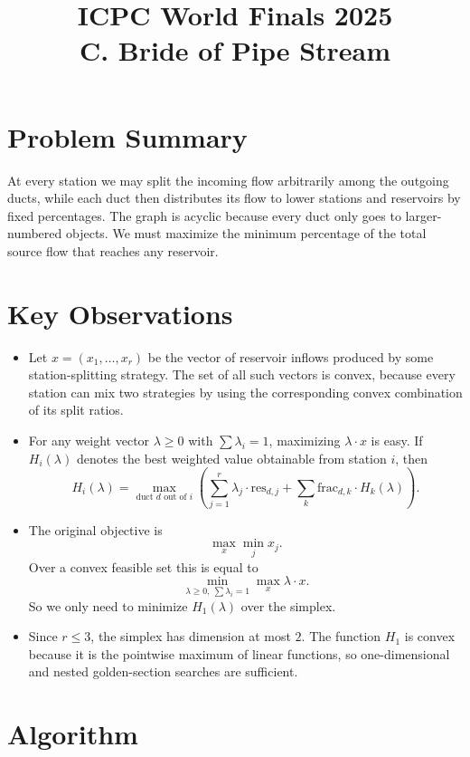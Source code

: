 \documentclass[11pt]{article}
\title{ICPC World Finals 2025\\C. Bride of Pipe Stream}
\author{}
\date{}
\begin{document}
\maketitle

\section*{Problem Summary}

At every station we may split the incoming flow arbitrarily among the outgoing ducts, while each duct
then distributes its flow to lower stations and reservoirs by fixed percentages. The graph is acyclic
because every duct only goes to larger-numbered objects. We must maximize the minimum percentage of
the total source flow that reaches any reservoir.

\section*{Key Observations}

\begin{itemize}[leftmargin=*]
    \item Let $x=(x_1,\dots,x_r)$ be the vector of reservoir inflows produced by some station-splitting
    strategy. The set of all such vectors is convex, because every station can mix two strategies by using
    the corresponding convex combination of its split ratios.
    \item For any weight vector $\lambda \ge 0$ with $\sum \lambda_i = 1$, maximizing
    $\lambda \cdot x$ is easy. If $H_i(\lambda)$ denotes the best weighted value obtainable from station $i$,
    then
    \[
    H_i(\lambda)=\max_{\text{duct }d\text{ out of }i}
    \left(\sum_{j=1}^{r} \lambda_j \cdot \text{res}_{d,j}
    + \sum_{k} \text{frac}_{d,k} \cdot H_k(\lambda)\right).
    \]
    \item The original objective is
    \[
    \max_x \min_j x_j.
    \]
    Over a convex feasible set this is equal to
    \[
    \min_{\lambda \ge 0,\ \sum \lambda_i=1} \max_x \lambda \cdot x.
    \]
    So we only need to minimize $H_1(\lambda)$ over the simplex.
    \item Since $r \le 3$, the simplex has dimension at most $2$. The function $H_1$ is convex because it
    is the pointwise maximum of linear functions, so one-dimensional and nested golden-section searches
    are sufficient.
\end{itemize}

\section*{Algorithm}
\end{document}
